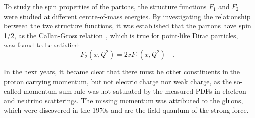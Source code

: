 To study the spin properties of the partons, the structure functions $F_1$ and $F_2$ were studied at different centre-of-mass energies. By investigating the relationship between the two structure functions, it was established that the partons have spin 1/2, as the Callan-Gross relation~\cite{Callan:1969uq}, which is true for point-like Dirac particles, was found to be satisfied:
\begin{equation*}
    F_2(x,Q^2) = 2x F_1(x,Q^2)\quad .
\end{equation*}

In the next years, it became clear that there must be other constituents in the proton carrying momentum, but not electric charge nor weak charge, as the so-called momentum sum rule was not saturated by the measured PDFs in electron and neutrino scatterings. The missing momentum was attributed to the gluons, which were discovered in the 1970s and are the field quantum of the strong force.


